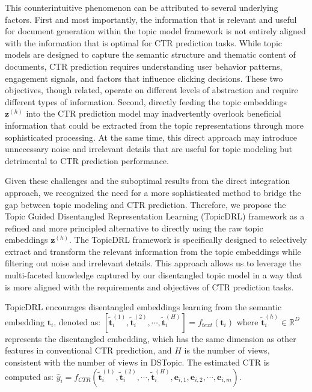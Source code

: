 This counterintuitive phenomenon can be attributed to several underlying factors. First and most importantly, the information that is relevant and useful for document generation within the topic model framework is not entirely aligned with the information that is optimal for CTR prediction tasks. While topic models are designed to capture the semantic structure and thematic content of documents, CTR prediction requires understanding user behavior patterns, engagement signals, and factors that influence clicking decisions. These two objectives, though related, operate on different levels of abstraction and require different types of information. Second, directly feeding the topic embeddings $\mathbf{z}^{(h)}$ into the CTR prediction model may inadvertently overlook beneficial information that could be extracted from the topic representations through more sophisticated processing. At the same time, this direct approach may introduce unnecessary noise and irrelevant details that are useful for topic modeling but detrimental to CTR prediction performance.

Given these challenges and the suboptimal results from the direct integration approach, we recognized the need for a more sophisticated method to bridge the gap between topic modeling and CTR prediction. Therefore, we propose the Topic Guided Disentangled Representation Learning (TopicDRL) framework as a refined and more principled alternative to directly using the raw topic embeddings $\mathbf{z}^{(h)}$. The TopicDRL framework is specifically designed to selectively extract and transform the relevant information from the topic embeddings while filtering out noise and irrelevant details. This approach allows us to leverage the multi-faceted knowledge captured by our disentangled topic model in a way that is more aligned with the requirements and objectives of CTR prediction tasks.

TopicDRL encourages disentangled embeddings learning from the semantic embedding $\mathbf{t}_i$, denoted as:
$[\tilde{\mathbf{t}}_i^{(1)}, \tilde{\mathbf{t}}_i^{(2)}, \cdots, \tilde{\mathbf{t}}_i^{(H)}] = f_{text}(\mathbf{t}_i)$
where $\tilde{\mathbf{t}}_i^{(h)} \in \mathbb{R}^D$ represents the disentangled embedding, which has the same dimension as other features in conventional CTR prediction, and $H$ is the number of views, consistent with the number of views in DSTopic. The estimated CTR is computed as:
$
\hat{y}_i = f_{CTR}(\tilde{\mathbf{t}}_i^{(1)}, \tilde{\mathbf{t}}_i^{(2)}, \cdots, \tilde{\mathbf{t}}_i^{(H)}, \mathbf{e}_{i,1}, \mathbf{e}_{i,2}, \cdots, \mathbf{e}_{i,m}).
$



